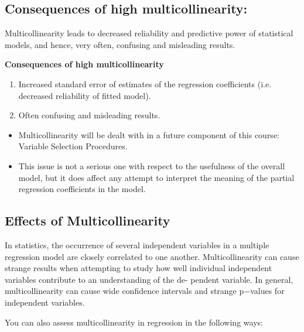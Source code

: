 \documentclass[a4paper,12pt]{article}
\begin{document}
\subsection{Consequences of high multicollinearity:}
Multicollinearity leads to decreased reliability and predictive power of statistical models, and hence, very
often, confusing and misleading results.

\textbf{Consequences of high multicollinearity}\\
\begin{enumerate}
	\item Increased standard error of estimates of the regression coefficients (i.e. decreased reliability of fitted
	model).
	\item Often confusing and misleading results.
\end{enumerate}

\begin{itemize}
	\item  Multicollinearity will be dealt with in a future component of this course: Variable Selection Procedures.
	\item  This issue is not a serious one with respect to the usefulness of the overall model, but it does affect any attempt to interpret the meaning of the partial regression coefficients in the model.

\end{itemize}

\subsection{Effects of Multicollinearity}

In statistics, the occurrence of several independent variables in a multiple regression model are
closely correlated to one another. Multicollinearity can cause strange results when attempting
to study how well individual independent variables contribute to an understanding of the de-
pendent variable. In general, multicollinearity can cause wide confidence intervals and strange
p−values for independent variables.

\bigskip

You can also assess multicollinearity in regression in the following ways:
\end{document}
